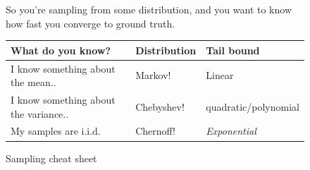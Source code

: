 \documentclass[11pt]{article}
\begin{document}
    \begin{figure}[H]
      So you're sampling from some distribution, and you want to know how fast
      you converge to ground truth.

      \begin{tabular}{lll}
        What do you know? & Distribution & Tail bound\\
        \hline
        I know something about the mean..  & Markov! & Linear \\
        I know something about the variance..  & Chebyshev! & quadratic/polynomial\\
        My samples are i.i.d.  & Chernoff! & \emph{Exponential}\\
        \hline
      \end{tabular}
      \caption{Sampling cheat sheet}
      \label{fig:bounds}
    \end{figure}


{}

\end{document}
